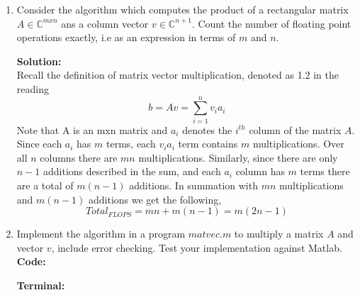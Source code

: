 \documentclass[12pt]{article}
\makeatletter
\theoremstyle{homework}
\newenvironment{exercise}[1]
{\def\@currentlabel{#1}\exercisecore}
{\endexercisecore}
\newcommand{\localhead}[1]{\par\smallskip\noindent\textbf{#1}\nobreak\\}%
\newcommand\solution{\localhead{Solution:}}
\newcommand{\Cplx}{\ensuremath{\mathbb C}}
\let\CC\Cplx
\makeatother
\begin{document}
\begin{exercise}{3}
    
    \begin{enumerate}
        \item Consider the algorithm which computes the product of a rectangular matrix $A \in \CC^{mxn}$
        ans a column vector $v \in \CC^{n+1}$. Count the number of floating point operations exactly, i.e as an 
        expression in terms of $m$ and $n$.\\

        \solution Recall the definition of matrix vector multiplication, denoted as 1.2 in the reading
        \begin{equation*}
            b = Av = \sum_{i = 1}^n v_ia_i
        \end{equation*}
        Note that A is an mxn matrix and $a_i$ denotes the $i^{th}$ column of the matrix $A$. Since each $a_i$
        has $m$ terms, each $v_ia_i$ term contains $m$ multiplications. Over all $n$ columns there are $mn$ multiplications. 
        Similarly, since there are only $n-1$ additions described in the sum, and each $a_i$ column has $m$ terms there are a total
        of $m(n-1)$ additions. In summation with $mn$ multiplications and $m(n-1)$ additions we get the following, 
        \begin{equation*}
            Total_{FLOPS} = mn + m(n-1) = m(2n-1) 
        \end{equation*}
        \vspace{.25in}
        \item Implement the algorithm in a program $matvec.m$ to multiply a matrix $A$ and vector $v$, include 
        error checking. Test your implementation against Matlab. \\
        \textbf{Code:}
		\begin{center}
			
		\end{center}

        \textbf{Terminal:}
		\begin{center}
			
		\end{center}
        \vspace{.25in}



\end{enumerate}
\end{exercise}
\end{document}
